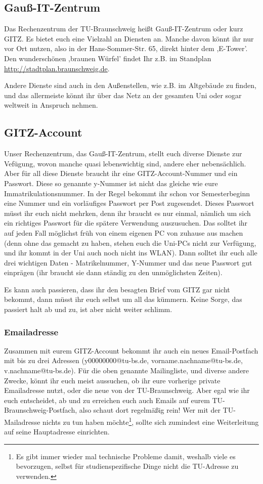 \begin{multicols}{2}
\subsection{Gauß-IT-Zentrum}
	Das Rechenzentrum der TU-Braunschweig heißt Gauß-IT-Zentrum oder kurz GITZ. Es bietet euch eine Vielzahl an Diensten an. Manche davon könnt ihr nur vor Ort nutzen, also in der Hans-Sommer-Str. 65, direkt hinter dem ,E-Tower'. Den wunderschönen ,braunen Würfel' findet Ihr z.B. im Standplan \url{http://stadtplan.braunschweig.de}.

	Andere Dienste sind auch in den Außenstellen, wie z.B. im Altgebäude zu finden, und das allermeiste könnt ihr über das Netz an der gesamten Uni oder sogar weltweit in Anspruch nehmen.

\subsection{GITZ-Account}
	Unser Rechenzentrum, das Gauß-IT-Zentrum, stellt euch diverse Dienste zur Vefügung, wovon manche quasi lebenswichtig sind, andere eher nebensächlich. Aber für all diese Dienste braucht ihr eine GITZ-Account-Nummer und ein Passwort. Diese so genannte y-Nummer ist nicht das gleiche wie eure Immatrikulationsnummer. In der Regel bekommt ihr schon vor Semesterbeginn eine Nummer und ein vorläufiges Passwort per Post zugesendet. Dieses Passwort müsst ihr euch nicht mehrken, denn ihr braucht es nur einmal, nämlich um sich ein richtiges Passwort für die spätere Verwendung auszusuchen. Das solltet ihr auf jeden Fall möglichst früh von einem eigenen PC von zuhause aus machen (denn ohne das gemacht zu haben, stehen euch die Uni-PCs nicht zur Verfügung, und ihr kommt in der Uni auch noch nicht ins WLAN). Dann solltet ihr euch alle drei wichtigen Daten - Matrikelnummer, Y-Nummer und das neue Passwort gut einprägen (ihr braucht sie dann ständig zu den unmöglichsten Zeiten).

	Es kann auch passieren, dass ihr den besagten Brief vom GITZ  gar nicht bekommt, dann müsst ihr euch selbst um all das kümmern. Keine Sorge, das passiert halt ab und zu, ist aber nicht weiter schlimm.

	\subsubsection{Emailadresse}
		\label{todomailing}
		Zusammen mit eurem GITZ-Account bekommt ihr auch ein neues Email-Postfach mit bis zu drei Adressen (y00000000@tu-bs.de, vorname.nachname@tu-bs.de, v.nachname@tu-bs.de). Für die oben genannte Mailingliste, und diverse andere Zwecke, könnt ihr euch meist aussuchen, ob ihr eure vorherige private Emailadresse nutzt, oder die neue von der TU-Braunschweig. Aber egal wie ihr euch entscheidet, ab und zu erreichen euch auch Emails auf eurem TU-Braunschweig-Postfach, also schaut dort regelmäßig rein! Wer mit der TU-Mailadresse nichts zu tun haben möchte\footnote{Es gibt immer wieder mal technische Probleme damit, weshalb viele es bevorzugen, selbst für studienspezifische Dinge nicht die TU-Adresse zu verwenden.}, sollte sich zumindest eine Weiterleitung auf seine Hauptadresse einrichten.


\end{multicols}
